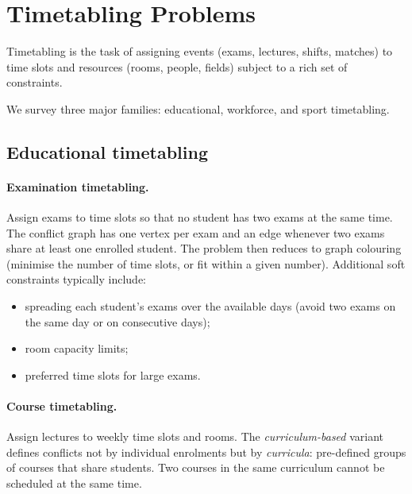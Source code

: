 \section{Timetabling Problems}
\label{sec:timetabling}

Timetabling is the task of assigning events (exams, lectures,
shifts, matches) to time slots and resources (rooms, people,
fields) subject to a rich set of constraints.%

We survey three major families: educational, workforce, and
sport timetabling.

\subsection{Educational timetabling}
\label{ssec:educational-timetabling}

\paragraph{Examination timetabling.}
Assign exams to time slots so that no student has two exams at
the same time.  The conflict graph has one vertex per exam and an
edge whenever two exams share at least one enrolled student.
The problem then reduces to graph colouring (minimise the number
of time slots, or fit within a given number).  Additional soft
constraints typically include:
\begin{itemize}[nosep]
  \item spreading each student's exams over the available days
        (avoid two exams on the same day or on consecutive days);
  \item room capacity limits;
  \item preferred time slots for large exams.
\end{itemize}

\paragraph{Course timetabling.}
Assign lectures to weekly time slots and rooms.
The \emph{curriculum-based} variant%
defines conflicts not by individual enrolments but by
\emph{curricula}: pre-defined groups of courses that share
students.  Two courses in the same curriculum cannot be scheduled
at the same time.

